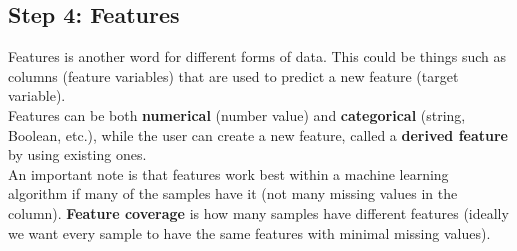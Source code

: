 \documentclass[11pt, a4paper]{article}
\begin{document}
\begin{spacing}{1.1}
	\subsection{Step 4: Features}
	Features is another word for different forms of data. This could be things such as columns (feature variables) that are used to predict a new feature (target variable). \vspace*{1mm} \\ 
	Features can be both \textbf{numerical} (number value) and \textbf{categorical} (string, Boolean, etc.), while the user can create a new feature, called a \textbf{derived feature} by using existing ones. \vspace*{2mm} \\
	An important note is that features work best within a machine learning algorithm if many of the samples have it (not many missing values in the column). \textbf{Feature coverage} is how many samples have different features (ideally we want every sample to have the same features with minimal missing values).	

\end{spacing}
\end{document}
